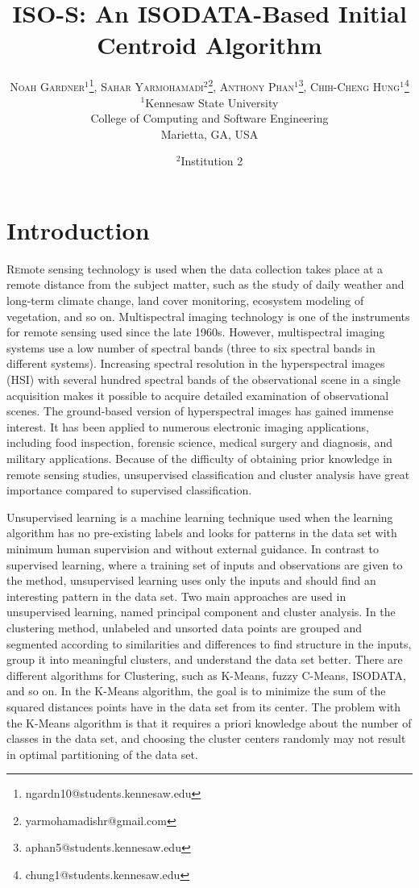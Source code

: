 \documentclass[twoside,twocolumn]{article}
\title{ISO-S: An ISODATA-Based Initial Centroid Algorithm} %
\author{%
  \textsc{
    Noah Gardner$^1$\thanks{ngardn10@students.kennesaw.edu}, 
    Sahar Yarmohamadi$^2$\thanks{yarmohamadishr@gmail.com},
    Anthony Phan$^1$\thanks{aphan5@students.kennesaw.edu},
    Chih-Cheng Hung$^1$\thanks{chung1@students.kennesaw.edu}}\\[1ex]
  \normalsize $^1$Kennesaw State University \\
  \normalsize College of Computing and Software Engineering \\
  \normalsize Marietta, GA, USA
  \and
  \normalsize $^2$Institution 2 \\ %
}
\date{} %
\begin{document}
\maketitle


\section{Introduction}

\lettrine[nindent=0em,lines=3]{R} emote sensing technology is used when
the data collection takes place at a remote distance from the subject matter,
such as the study of daily weather and long-term climate change, land cover
monitoring, ecosystem modeling of vegetation, and so on. Multispectral imaging
technology is one of the instruments for remote sensing used since the late
1960s. However, multispectral imaging systems use a low number of spectral bands
(three to six spectral bands in different systems). Increasing spectral
resolution in the hyperspectral images (HSI) with several hundred spectral bands
of the observational scene in a single acquisition makes it possible to acquire
detailed examination of observational scenes. The ground-based version of
hyperspectral images has gained immense interest. It has been applied to
numerous electronic imaging applications, including food inspection, forensic
science, medical surgery and diagnosis, and military applications. Because of
the difficulty of obtaining prior knowledge in remote sensing studies,
unsupervised classification and cluster analysis have great importance compared
to supervised classification. 

Unsupervised learning is a machine learning technique used when the learning
algorithm has no pre-existing labels and looks for patterns in the data set with
minimum human supervision and without external guidance. In contrast to
supervised learning, where a training set of inputs and observations are given
to the method, unsupervised learning uses only the inputs and should find an
interesting pattern in the data set. Two main approaches are used in
unsupervised learning, named principal component and cluster analysis. In the
clustering method, unlabeled and unsorted data points are grouped and segmented
according to similarities and differences to find structure in the inputs, group
it into meaningful clusters, and understand the data set better. There are
different algorithms for Clustering, such as K-Means, fuzzy C-Means, ISODATA,
and so on. In the K-Means algorithm, the goal is to minimize the sum of the
squared distances points have in the data set from its center. The problem with
the K-Means algorithm is that it requires a priori knowledge about the number of
classes in the data set, and choosing the cluster centers randomly may not
result in optimal partitioning of the data set.
\end{document}
